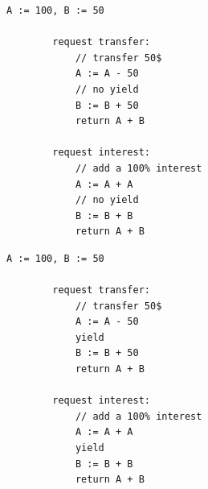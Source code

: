 \noindent
\begin{minipage}[t]{0.45\textwidth}
	\begin{lstlisting}[caption={Serializable},
		label={lst:BankSer},numbers=none]
	    A := 100, B := 50
	    
	    request transfer: 
	        // transfer 50$
	        A := A - 50
	        // no yield
	        B := B + 50
	        return A + B
				
	    request interest: 
	        // add a 100% interest
	        A := A + A
	        // no yield
	        B := B + B
	        return A + B      
			\end{lstlisting}
\end{minipage}
\hfill
\begin{minipage}[t]{0.45\textwidth}
	\begin{lstlisting}[caption={Not serializable},
		label={lst:BankNonSer},numbers=none]
	    A := 100, B := 50
			
	    request transfer: 
	        // transfer 50$
	        A := A - 50
	        yield
	        B := B + 50
	        return A + B
	
	    request interest: 
	        // add a 100% interest
	        A := A + A
	        yield
	        B := B + B
	        return A + B
      		\end{lstlisting}
\end{minipage}
	

%




